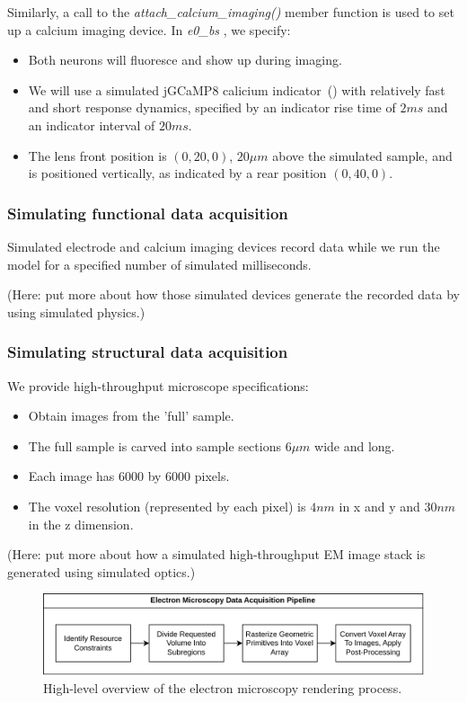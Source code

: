 \documentclass{ldr-article}
\def\firstexp{\textit{e0\_bs} }
\begin{document}
Similarly, a call to the \textit{attach\_calcium\_imaging()} member function is used to set up a calcium imaging device. In \firstexp, we specify:
\begin{itemize}
	\item Both neurons will fluoresce and show up during imaging.
	\item We will use a simulated jGCaMP8 calicium indicator~(\cite{zhang2023}) with relatively fast and short response dynamics, specified by an indicator rise time of $2 ms$ and an indicator interval of $20 ms$.
	\item The lens front position is $(0, 20, 0)$, $20 \mu m$ above the simulated sample, and is positioned vertically, as indicated by a rear position $(0, 40, 0)$.
\end{itemize}

\subsubsection{Simulating functional data acquisition}

Simulated electrode and calcium imaging devices record data while we run the model for a specified number of simulated milliseconds.

(Here: put more about how those simulated devices generate the recorded data by using simulated physics.)


\subsubsection{Simulating structural data acquisition}

We provide high-throughput microscope specifications:
\begin{itemize}
	\item Obtain images from the 'full' sample.
	\item The full sample is carved into sample sections $6 \mu m$ wide and long.
	\item Each image has $6000$ by $6000$ pixels.
	\item The voxel resolution (represented by each pixel) is $4 nm$ in x and y and $30 nm$ in the z dimension.
\end{itemize}

(Here: put more about how a simulated high-throughput EM image stack is generated using simulated optics.)

\begin{figure}
	\centering
	\includegraphics[width=1\linewidth]{Figures/VBP_EM_Render_Pipeline.drawio.png}
	\caption{High-level overview of the electron microscopy rendering process.}
	\label{fig:em-pipeline}
\end{figure}
\end{document}
